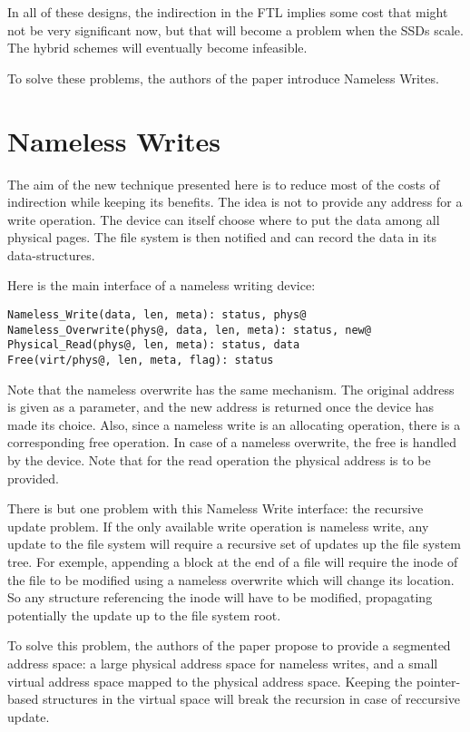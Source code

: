 \documentclass[twocolumn,a4paper,10pt]{article}
\begin{document}
In all of these designs, the indirection in the FTL implies some cost that
might not be very significant now, but that will become a problem when the
SSDs scale. The hybrid schemes will eventually become infeasible.

To solve these problems, the authors of the paper introduce Nameless Writes.

\section*{Nameless Writes}
The aim of the new technique presented here is to reduce most of the costs of
indirection while keeping its benefits. The idea is not to provide any address
for a write operation. The device can itself choose where to put the data
among all physical pages. The file system is then notified and can record the
data in its data-structures.

Here is the main interface of a nameless writing device:
\begin{lstlisting}
Nameless_Write(data, len, meta): status, phys@
Nameless_Overwrite(phys@, data, len, meta): status, new@
Physical_Read(phys@, len, meta): status, data
Free(virt/phys@, len, meta, flag): status
\end{lstlisting}
Note that the nameless overwrite has the same mechanism. The original address
is given as a parameter, and the new address is returned once the device has
made its choice. Also, since a nameless write is an allocating operation,
there is a corresponding free operation. In case of a nameless overwrite, the
free is handled by the device. Note that for the read operation the physical
address is to be provided.

There is but one problem with this Nameless Write interface: the recursive
update problem. If the only available write operation is nameless write, any
update to the file system will require a recursive set of updates up the file
system tree. For exemple, appending a block at the end of a file will require
the inode of the file to be modified using a nameless overwrite which will
change its location. So any structure referencing the inode will have to be
modified, propagating potentially the update up to the file system root.

To solve this problem, the authors of the paper propose to provide a segmented
address space: a large physical address space for nameless writes, and a small
virtual address space mapped to the physical address space. Keeping the
pointer-based structures in the virtual space will break the recursion in case
of reccursive update.
\end{document}
